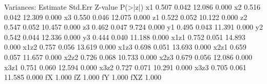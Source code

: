 \begin{Schunk}
\begin{Soutput}
Variances:
                   Estimate  Std.Err  Z-value  P(>|z|)
    x1                0.507    0.042   12.086    0.000
    x2                0.516    0.042   12.309    0.000
    x3                0.550    0.046   12.075    0.000
    z1                0.522    0.052   10.122    0.000
    z2                0.547    0.052   10.457    0.000
    z3                0.462    0.047    9.724    0.000
    y1                0.495    0.043   11.391    0.000
    y2                0.542    0.044   12.336    0.000
    y3                0.444    0.040   11.188    0.000
    x1z1              0.752    0.051   14.893    0.000
    x1z2              0.757    0.056   13.619    0.000
    x1z3              0.698    0.051   13.693    0.000
    x2z1              0.659    0.057   11.657    0.000
    x2z2              0.726    0.068   10.733    0.000
    x2z3              0.679    0.056   12.086    0.000
    x3z1              0.751    0.060   12.594    0.000
    x3z2              0.727    0.071   10.291    0.000
    x3z3              0.705    0.061   11.585    0.000
    fX                1.000                           
    fZ                1.000                           
    fY                1.000                           
    fXZ               1.000                           
\end{Soutput}
\end{Schunk}
